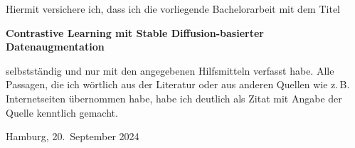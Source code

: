 Hiermit versichere ich, dass ich die vorliegende Bachelorarbeit mit dem Titel
\begin{center}
  \textbf{Contrastive Learning mit Stable Diffusion-basierter Datenaugmentation}
\end{center}
selbstständig und nur mit den angegebenen Hilfsmitteln verfasst habe.  Alle
Passagen, die ich wörtlich aus der Literatur oder aus anderen Quellen wie
z.\,B. Internetseiten übernommen habe, habe ich deutlich als Zitat mit Angabe
der Quelle kenntlich gemacht.

\vspace{2cm}

Hamburg, 20.\ September 2024
